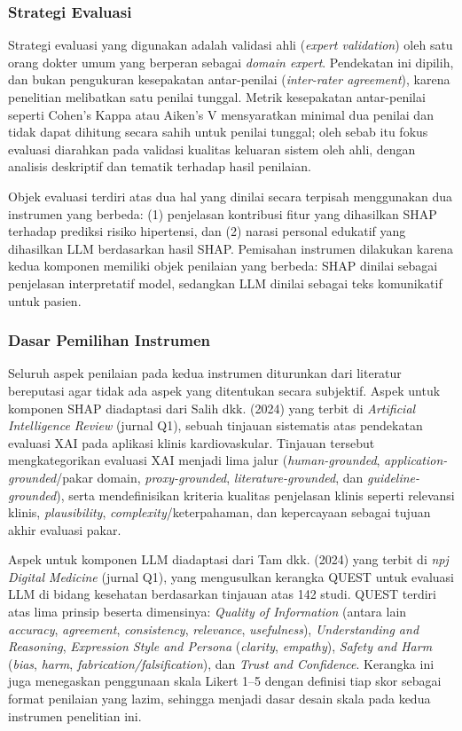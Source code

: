 \subsubsection{Strategi Evaluasi}
Strategi evaluasi yang digunakan adalah validasi ahli (\emph{expert validation})
oleh satu orang dokter umum yang berperan sebagai \emph{domain expert}. Pendekatan
ini dipilih, dan bukan pengukuran kesepakatan antar-penilai (\emph{inter-rater
agreement}), karena penelitian melibatkan satu penilai tunggal. Metrik kesepakatan
antar-penilai seperti Cohen's Kappa atau Aiken's V mensyaratkan minimal dua penilai
dan tidak dapat dihitung secara sahih untuk penilai tunggal; oleh sebab itu fokus
evaluasi diarahkan pada validasi kualitas keluaran sistem oleh ahli, dengan analisis
deskriptif dan tematik terhadap hasil penilaian.

Objek evaluasi terdiri atas dua hal yang dinilai secara terpisah menggunakan dua
instrumen yang berbeda: (1) penjelasan kontribusi fitur yang dihasilkan SHAP terhadap
prediksi risiko hipertensi, dan (2) narasi personal edukatif yang dihasilkan LLM
berdasarkan hasil SHAP. Pemisahan instrumen dilakukan karena kedua komponen memiliki
objek penilaian yang berbeda: SHAP dinilai sebagai penjelasan interpretatif model,
sedangkan LLM dinilai sebagai teks komunikatif untuk pasien.

\subsubsection{Dasar Pemilihan Instrumen}
\label{sec:dasar-instrumen}
Seluruh aspek penilaian pada kedua instrumen diturunkan dari literatur bereputasi
agar tidak ada aspek yang ditentukan secara subjektif. Aspek untuk komponen SHAP
diadaptasi dari Salih dkk. (2024) yang terbit di \emph{Artificial Intelligence Review}
(jurnal Q1), sebuah tinjauan sistematis atas pendekatan evaluasi XAI pada aplikasi
klinis kardiovaskular. Tinjauan tersebut mengkategorikan evaluasi XAI menjadi lima
jalur (\emph{human-grounded}, \emph{application-grounded}/pakar domain,
\emph{proxy-grounded}, \emph{literature-grounded}, dan \emph{guideline-grounded}),
serta mendefinisikan kriteria kualitas penjelasan klinis seperti relevansi klinis,
\emph{plausibility}, \emph{complexity}/keterpahaman, dan kepercayaan sebagai tujuan
akhir evaluasi pakar.

Aspek untuk komponen LLM diadaptasi dari Tam dkk. (2024) yang terbit di
\emph{npj Digital Medicine} (jurnal Q1), yang mengusulkan kerangka QUEST untuk
evaluasi LLM di bidang kesehatan berdasarkan tinjauan atas 142 studi. QUEST terdiri
atas lima prinsip beserta dimensinya: \emph{Quality of Information} (antara lain
\emph{accuracy}, \emph{agreement}, \emph{consistency}, \emph{relevance},
\emph{usefulness}), \emph{Understanding and Reasoning}, \emph{Expression Style and
Persona} (\emph{clarity}, \emph{empathy}), \emph{Safety and Harm} (\emph{bias},
\emph{harm}, \emph{fabrication/falsification}), dan \emph{Trust and Confidence}.
Kerangka ini juga menegaskan penggunaan skala Likert 1--5 dengan definisi tiap skor
sebagai format penilaian yang lazim, sehingga menjadi dasar desain skala pada kedua
instrumen penelitian ini.

